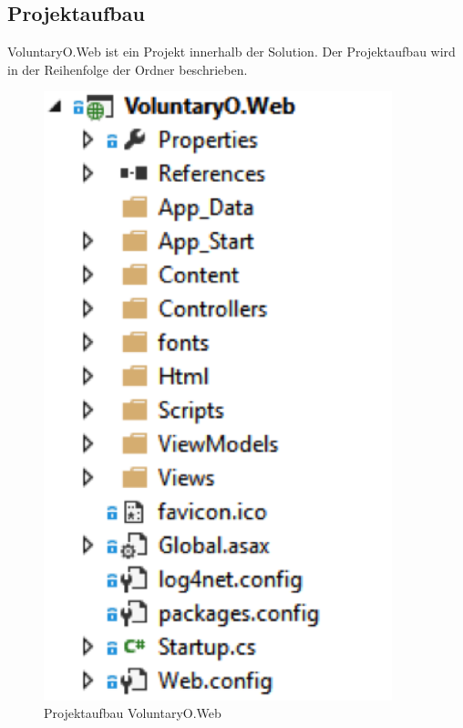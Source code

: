 	\subsection{Projektaufbau}
		VoluntaryO.Web ist ein Projekt innerhalb der Solution. Der Projektaufbau wird in der Reihenfolge der Ordner beschrieben.
		\begin{figure}[h]
	  		\vspace{-5pt}
	    	\centering
	    	 \includegraphics[width=0.9\textwidth]{content/architekturdokumentation/images/web-1-Projektaufbau.png}
	  		\vspace{-25pt}
			\caption{Projektaufbau VoluntaryO.Web}
		\end{figure}
		
